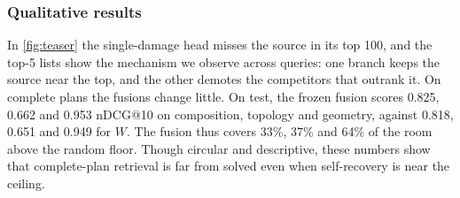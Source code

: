 \subsubsection{Qualitative results}
\label{sec:qualitative}


In \cref{fig:teaser} the single-damage head misses the source in its top 100, and the top-5 lists show the mechanism we observe across queries: one branch keeps the source near the top, and the other demotes the competitors that outrank it.
On complete plans the fusions change little.
On test, the frozen fusion scores 0.825, 0.662 and 0.953 nDCG@10 on composition, topology and geometry, against 0.818, 0.651 and 0.949 for $W$.
The fusion thus covers 33\%, 37\% and 64\% of the room above the random floor.
Though circular and descriptive, these numbers show that complete-plan retrieval is far from solved even when self-recovery is near the ceiling.
